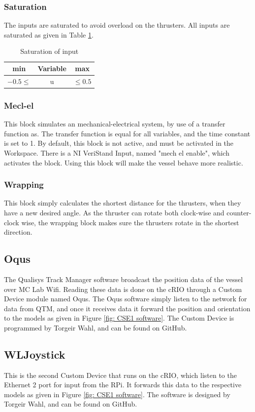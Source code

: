 \subsubsection{Saturation}
The inputs are saturated to avoid overload on the thrusters. All inputs are saturated as given in Table \ref{tab:saturation}. 
\begin{table}[htb!]
	\centering
	\caption{Saturation of input}
	\label{tab:saturation}
	\begin{tabular}{ccc}
		\hline
		\textbf{min} & \textbf{Variable} & \textbf{max}\\ \hline
		$-0.5\le $ & u &$\le 0.5$ \\ \hline
	\end{tabular}
\end{table}
\subsubsection{Mecl-el}
This block simulates an mechanical-electrical system, by use of a transfer function as. The transfer function is equal for all variables, and the time constant is set to 1. By default, this block is not active, and must be activated in the Workspace. There is a NI VeriStand Input, named "mech el enable", which activates the block. Using this block will make the vessel behave more realistic. 
\subsubsection{Wrapping}
This block simply calculates the shortest distance for the thrusters, when they have a new desired angle. As the thruster can rotate both clock-wise and counter-clock wise, the wrapping block makes sure the thrusters rotate in the shortest direction. 

\subsection{Oqus}
The Qualisys Track Manager software broadcast the position data of the vessel over MC Lab Wifi. Reading these data is done on the cRIO through a Custom Device module named Oqus. The Oqus software simply listen to the network for data from QTM, and once it receives data it forward the position and orientation to the models as given in Figure \ref{fig: CSE1 software}. The Custom Device is programmed by Torgeir Wahl, and can be found on GitHub. 
\subsection{WL\textunderscore Joystick}
This is the second Custom Device that runs on the cRIO, which listen to the Ethernet 2 port for input from the RPi. It forwards this data to the respective models as given in Figure \ref{fig: CSE1 software}. The software is designed by Torgeir Wahl, and can be found on GitHub. 
